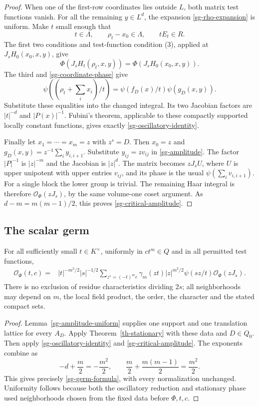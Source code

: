 \begin{proof}
When one of the first-row coordinates lies outside $L$,
both matrix test functions vanish.  For all the remaining
$y\in L^d$, the expansion \eqref{sg-rho-expansion} is uniform.
Make $t$ small enough that
\[
 t\in\Lambda,\qquad
 \rho_t-x_0\in\Lambda,\qquad tE_t\in R.
\]
The first two conditions and test-function condition (3),
applied at $J_sH_0(x_0,x,y)$, give
\[
 \Phi(J_sH_t(\rho_t,x,y))
                  =\Phi(J_sH_0(x_0,x,y)).
\]
The third and \eqref{sg-coordinate-phase} give
\[
 \psi\left((\rho_t+\sum_i x_i)/t\right)
                 =\psi(f_D(x)/t)\psi(g_D(x,y)).
\]
Substitute these equalities into the changed integral.
Its two Jacobian factors are $|t|^{-d}$ and $|P(x)|^{-1}$.
Fubini's theorem, applicable to these compactly supported
locally constant functions, gives exactly
\eqref{sg-oscillatory-identity}.

Finally let $x_1=\cdots=x_m=z$ with $z^s=D$.  Then
$x_0=z$ and $g_D(x,y)=z^{-1}\sum_i y_{i,i+1}$.
Substitute $y_{ij}=zv_{ij}$ in \eqref{sg-amplitude}.
The factor $|P|^{-1}$ is $|z|^{-m}$ and the Jacobian is
$|z|^d$.  The matrix becomes $zJ_sU$, where $U$ is upper
unipotent with upper entries $v_{ij}$, and its phase is the
usual $\psi(\sum_i v_{i,i+1})$.  For a single block the lower
group is trivial.  The remaining Haar integral is therefore
$\mathcal O_\Phi(zJ_s)$, by the same volume-one coset argument.
As $d-m=m(m-1)/2$, this proves
\eqref{sg-critical-amplitude}.
\end{proof}

\subsection{The scalar germ}

\begin{corollary}\label{sg-scalar-germ}
For all sufficiently small $t\in K^\times$, uniformly in
$ct^m\in Q$ and in all permitted test functions,
\begin{align}\label{sg-germ-formula}
 \mathcal O_\Phi(t,c)
 ={}&|t|^{-m^2/2}|s|^{-1/2}
   \sum_{z^s=(-t)^mc}\gamma_m(zt)|z|^{m^2/2}
                     \psi(sz/t)\mathcal O_\Phi(zJ_s).
\end{align}
There is no exclusion of residue characteristics dividing
$2s$; all neighborhoods may depend on $m$, the local field
product, the order, the character and the stated compact sets.
\end{corollary}

\begin{proof}
Lemma~\ref{sg-amplitude-uniform} supplies one support and one
translation lattice for every $A_D$.  Apply
Theorem~\ref{th-stationary} with these data and $D\in Q_0$.
Then apply \eqref{sg-oscillatory-identity} and
\eqref{sg-critical-amplitude}.  The exponents combine as
\[
 -d+\frac m2=-\frac{m^2}{2},\qquad
 \frac m2+\frac{m(m-1)}2=\frac{m^2}{2}.
\]
This gives precisely \eqref{sg-germ-formula}, with every
normalization unchanged.  Uniformity follows because both
the oscillatory reduction and stationary phase used
neighborhoods chosen from the fixed data before $\Phi,t,c$.
\end{proof}

